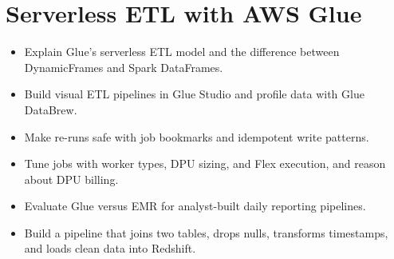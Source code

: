 \chapter{Serverless ETL with AWS Glue}
%
\begin{objectives}
\begin{itemize}
    \item Explain Glue's serverless ETL model and the difference between DynamicFrames and Spark DataFrames.
    \item Build visual ETL pipelines in Glue Studio and profile data with Glue DataBrew.
    \item Make re-runs safe with job bookmarks and idempotent write patterns.
    \item Tune jobs with worker types, DPU sizing, and Flex execution, and reason about DPU billing.
    \item Evaluate Glue versus EMR for analyst-built daily reporting pipelines.
    \item Build a pipeline that joins two tables, drops nulls, transforms timestamps, and loads clean data into Redshift.
\end{itemize}
\end{objectives}

